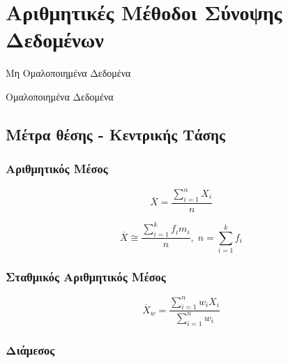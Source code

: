 \section{Αριθμητικές Μέθοδοι Σύνοψης Δεδομένων}

\begin{multicols}{2}

  Μη Ομαλοποιημένα Δεδομένα

  \columnbreak

  Ομαλοποιημένα Δεδομένα

\end{multicols}

\subsection*{Μέτρα θέσης - Κεντρικής Τάσης}

\subsubsection*{Αριθμητικός Μέσος}

\begin{multicols}{2}
  \begin{equation*}
    \overline{X}=\frac{\sum_{i=1}^{n}X_{i}}{n}
  \end{equation*}

  \begin{equation*}
    \overline{X}\cong\frac{\sum_{i=1}^{k}f_{i}m_{i}}{n},\; n=\sum_{i=1}^{k}f_i
  \end{equation*}
\end{multicols}

\subsubsection*{Σταθμικός Αριθμητικός Μέσος}

\begin{multicols}{2}
  \begin{equation*}
    \overline{X}_{w}=\frac{\sum_{i=1}^{n}w_{i}X_{i}}{\sum_{i=1}^{n}w_{i}}
  \end{equation*}
\end{multicols}


\subsubsection*{Διάμεσος}

